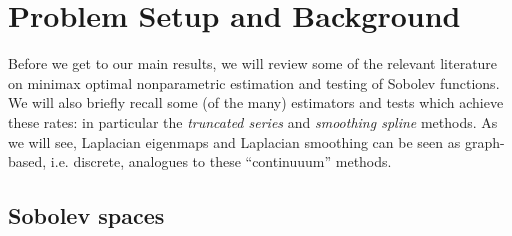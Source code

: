 \documentclass{article}
\newcommand{\1}{\mathbf{1}}
\theoremstyle{alden}
\theoremstyle{aldenthm}
\theoremstyle{definition}
\theoremstyle{remark}
\begin{document}
\section{Problem Setup and Background}
\label{sec:problem_setup_and_background}

Before we get to our main results, we will review some of the relevant literature on minimax optimal nonparametric estimation and testing of Sobolev functions. We will also briefly recall some (of the many) estimators and tests which achieve these rates: in particular the \emph{truncated series} and \emph{smoothing spline} methods. As we will see, Laplacian eigenmaps and Laplacian smoothing can be seen as graph-based, i.e. discrete, analogues to these ``continuuum'' methods.

\subsection{Sobolev spaces}
\label{subsec:sobolev_spaces}
\end{document}
